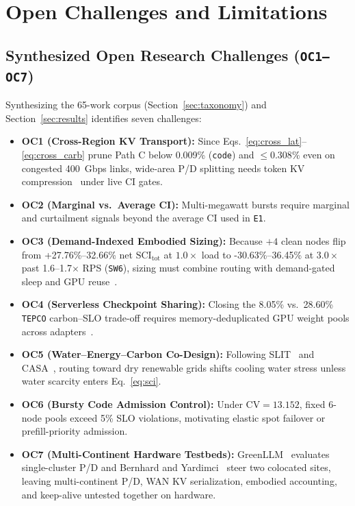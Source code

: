 \section{Open Challenges and Limitations}\label{sec:challenges}

\subsection{Synthesized Open Research Challenges (\texorpdfstring{\texttt{OC1--OC7}}{OC1-OC7})}\label{subsec:open_challenges}
Synthesizing the 65-work corpus (Section~\ref{sec:taxonomy}) and Section~\ref{sec:results} identifies seven challenges:
\begin{itemize}
    \item \textbf{OC1 (Cross-Region KV Transport):} Since Eqs.~\eqref{eq:cross_lat}--\eqref{eq:cross_carb} prune Path C below 0.009\% (\texttt{code}) and $\le 0.308\%$ even on congested 400~Gbps links, wide-area P/D splitting needs token KV compression~\cite{jiang2026kvcache} under live CI gates.
    \item \textbf{OC2 (Marginal vs.\ Average CI):} Multi-megawatt bursts require marginal and curtailment signals beyond the average CI used in \texttt{E1}.
    \item \textbf{OC3 (Demand-Indexed Embodied Sizing):} Because $+4$ clean nodes flip from +27.76\%--32.66\% net $\text{SCI}_{\text{tot}}$ at $1.0\times$ load to -30.63\%--36.45\% at $3.0\times$ past 1.6--1.7$\times$ RPS (\texttt{SW6}), sizing must combine routing with demand-gated sleep and GPU reuse~\cite{li2025ecoserve,shi2024greenllm}.
    \item \textbf{OC4 (Serverless Checkpoint Sharing):} Closing the 8.05\% vs.\ 28.60\% \texttt{TEPCO} carbon--SLO trade-off requires memory-deduplicated GPU weight pools across adapters~\cite{wang2026festina}.
    \item \textbf{OC5 (Water--Energy--Carbon Co-Design):} Following SLIT~\cite{moore2025slit} and CASA~\cite{qi2024casa}, routing toward dry renewable grids shifts cooling water stress unless water scarcity enters Eq.~\eqref{eq:sci}.
    \item \textbf{OC6 (Bursty Code Admission Control):} Under $\text{CV} = 13.152$, fixed 6-node pools exceed 5\% SLO violations, motivating elastic spot failover or prefill-priority admission.
    \item \textbf{OC7 (Multi-Continent Hardware Testbeds):} GreenLLM~\cite{shi2024greenllm} evaluates single-cluster P/D and Bernhard and Yardimci~\cite{bernhard2026cleanest} steer two colocated sites, leaving multi-continent P/D, WAN KV serialization, embodied accounting, and keep-alive untested together on hardware.
\end{itemize}

